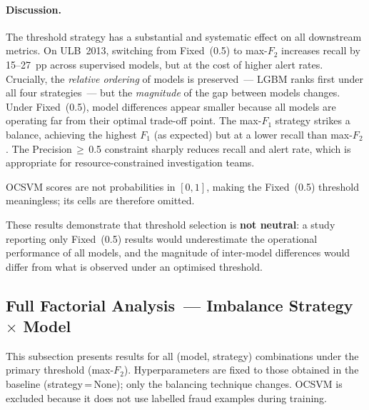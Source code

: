 \paragraph{Discussion.}
The threshold strategy has a substantial and systematic effect on all downstream metrics.
On ULB~2013, switching from Fixed~(0.5) to max-$F_2$ increases recall by 15--27~pp
across supervised models, but at the cost of higher alert rates.
Crucially, the \emph{relative ordering} of models is preserved~---
LGBM ranks first under all four strategies~--- but the \emph{magnitude} of the gap between models changes.
Under Fixed~(0.5), model differences appear smaller because all models are operating far from their optimal trade-off point.
The max-$F_1$ strategy strikes a balance, achieving the highest $F_1$ (as expected) but at a lower recall than max-$F_2$.
The Precision\,$\geq$\,0.5 constraint sharply reduces recall and alert rate,
which is appropriate for resource-constrained investigation teams.

OCSVM scores are not probabilities in $[0,1]$, making the Fixed~(0.5) threshold meaningless;
its cells are therefore omitted.

These results demonstrate that threshold selection is \textbf{not neutral}:
a study reporting only Fixed~(0.5) results would underestimate
the operational performance of all models, and the magnitude of inter-model
differences would differ from what is observed under an optimised threshold.



\subsection{Full Factorial Analysis~--- Imbalance Strategy $\times$ Model}
\label{sec:factorial_results}

This subsection presents results for all (model, strategy) combinations
under the primary threshold (max-$F_2$).
Hyperparameters are fixed to those obtained in the baseline (strategy\,=\,None);
only the balancing technique changes.
OCSVM is excluded because it does not use labelled fraud examples during training.

